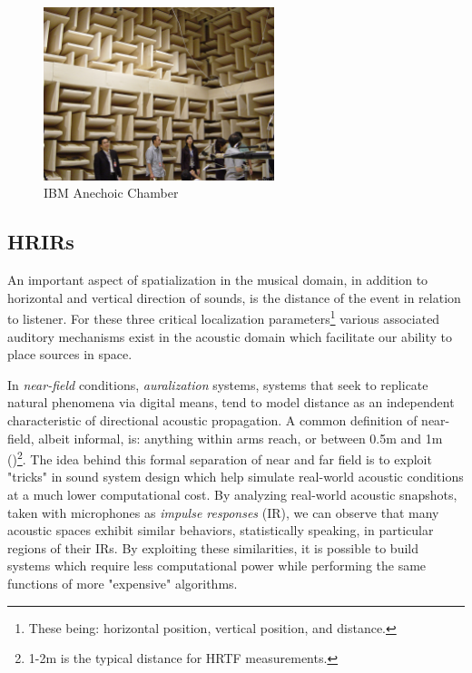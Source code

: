 \begin{figure}[ht!]%
\centering
\includegraphics[width=0.6\textwidth]{img/ibm-anechoic.jpg} 
\caption{IBM Anechoic Chamber \cite{FileIBMA4:online}}
\label{fig:ibm-anechoic}
\end{figure}


\subsection{HRIRs}\label{subsec:hrirs}

An important aspect of spatialization in the musical domain, in addition to horizontal and vertical direction of sounds, is the distance of the event in relation to listener. For these three critical localization parameters\footnote{These being: horizontal position, vertical position, and distance.} various associated auditory mechanisms exist in the acoustic domain which facilitate our ability to place sources in space. 

In \textit{near-field} conditions, \textit{auralization} systems, systems that seek to replicate natural phenomena via digital means, tend to model distance as an independent characteristic of directional acoustic propagation. A common definition of near-field, albeit informal, is: anything within arms reach, or between 0.5m and 1m (\cite{Betbeder.2017})\footnote{1-2m is the typical distance for HRTF measurements.}. The idea behind this formal separation of near and far field is to exploit "tricks" in sound system design which help simulate real-world acoustic conditions at a much lower computational cost. By analyzing real-world acoustic snapshots, taken with microphones as \textit{impulse responses} (IR), we can observe that many acoustic spaces exhibit similar behaviors, statistically speaking, in particular regions of their IRs. By exploiting these similarities, it is possible to build systems which require less computational power while performing the same functions of more "expensive" algorithms.

